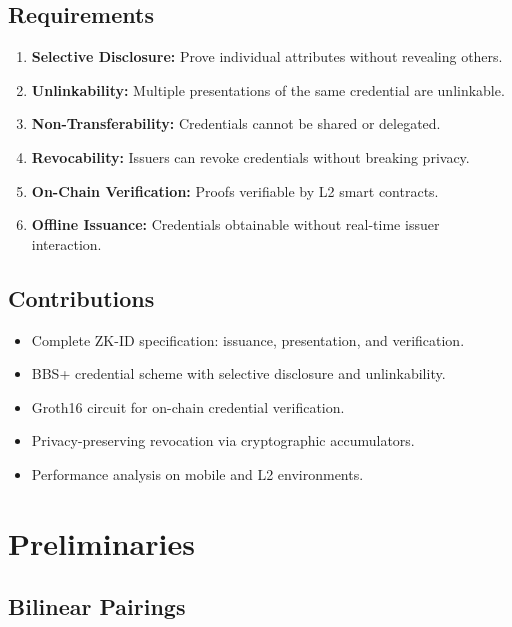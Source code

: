\documentclass[11pt,a4paper]{article}
\begin{document}
\subsection{Requirements}

\begin{enumerate}[label=\textbf{R\arabic*:}]
    \item \textbf{Selective Disclosure:} Prove individual attributes
    without revealing others.
    \item \textbf{Unlinkability:} Multiple presentations of the same
    credential are unlinkable.
    \item \textbf{Non-Transferability:} Credentials cannot be shared or
    delegated.
    \item \textbf{Revocability:} Issuers can revoke credentials without
    breaking privacy.
    \item \textbf{On-Chain Verification:} Proofs verifiable by L2 smart
    contracts.
    \item \textbf{Offline Issuance:} Credentials obtainable without
    real-time issuer interaction.
\end{enumerate}

\subsection{Contributions}

\begin{itemize}
    \item Complete ZK-ID specification: issuance, presentation, and
    verification.
    \item BBS+ credential scheme with selective disclosure and
    unlinkability.
    \item Groth16 circuit for on-chain credential verification.
    \item Privacy-preserving revocation via cryptographic accumulators.
    \item Performance analysis on mobile and L2 environments.
\end{itemize}

\section{Preliminaries}
\label{sec:prelim}

\subsection{Bilinear Pairings}
\end{document}
